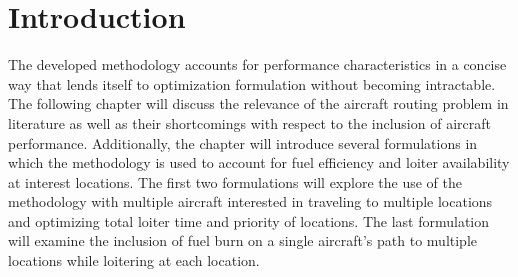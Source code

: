 \section{Introduction}
The developed methodology accounts for performance characteristics in a concise way that lends itself to optimization formulation without becoming intractable. The following chapter will discuss the relevance of the aircraft routing problem in literature as well as their shortcomings with respect to the inclusion of aircraft performance. Additionally, the chapter will introduce several formulations in which the methodology is used to account for fuel efficiency and loiter availability at interest locations. The first two formulations will explore the use of the methodology with multiple aircraft interested in traveling to multiple locations and optimizing total loiter time and priority of locations. The last formulation will examine the inclusion of fuel burn on a single aircraft's path to multiple locations while loitering at each location.
